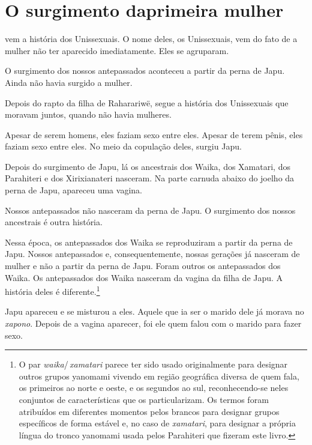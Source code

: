 \chapter[O surgimento da primeira mulher]{O surgimento da\break primeira mulher}
 
 vem a história dos Unissexuais. O nome deles, os Unissexuais, vem
do fato de a mulher não ter aparecido imediatamente. Eles se agruparam. 

O surgimento dos nossos antepassados aconteceu a partir da perna de
Japu. Ainda não havia surgido a mulher. 

Depois do rapto da filha de Raharariwë, segue a história dos Unissexuais
que moravam juntos, quando não havia mulheres. 

Apesar de serem homens, eles faziam sexo entre eles. Apesar de terem
pênis, eles faziam sexo entre eles. No meio da copulação
deles, surgiu Japu. 

Depois do surgimento de Japu, lá os ancestrais dos Waika, dos Xamatari,
dos Parahiteri e dos Xirixianateri nasceram. Na parte carnuda abaixo do
joelho da perna de Japu, apareceu uma vagina. 

Nossos antepassados não nasceram da perna de Japu. O surgimento dos
nossos ancestrais é outra história. 

Nessa época, os antepassados dos Waika se reproduziram a partir da
perna de Japu. Nossos antepassados e, consequentemente, nossas gerações
já nasceram de mulher e não a partir da perna de Japu. Foram outros
os antepassados dos Waika. Os antepassados dos Waika nasceram da vagina da
filha de Japu. A história deles é diferente.\footnote{O par \textit{waika}/\,\textit{xamatari} parece ter sido usado originalmente para designar outros grupos yanomami vivendo em região geográfica diversa de quem fala, os primeiros ao norte e oeste, e os segundos ao sul, reconhecendo-se neles conjuntos de características que os particularizam. Os termos foram atribuídos em diferentes momentos pelos brancos para designar grupos específicos de forma estável e, no caso de \textit{xamatari}, para designar a própria língua do tronco yanomami usada pelos Parahiteri que fizeram este livro.} 

Japu apareceu e se misturou a eles. Aquele que ia ser o marido
dele já morava no \textit{xapono}. Depois de a vagina aparecer, foi ele quem
falou com o marido para fazer sexo. 

